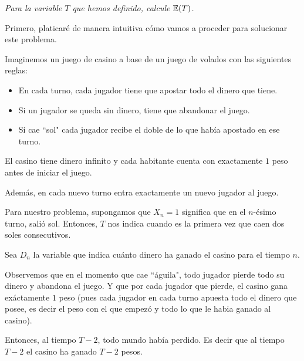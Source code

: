 \emph
{
	Para la variable $T$ que hemos definido, calcule $\mathbb{E}\! \left( T \right)$.
}\par\null

\afterstatement

	Primero, platicaré de manera intuitiva cómo vamos a proceder para solucionar este problema.\par\null

	Imaginemos un juego de casino a base de un juego de volados con las siguientes reglas:\par\null
    
	\begin{itemize}
			\item En cada turno, cada jugador tiene que apostar todo el dinero que tiene.
			\item Si un jugador se queda sin dinero, tiene que abandonar el juego.
			\item Si cae ``sol" cada jugador recibe el doble de lo que había apostado en ese turno.  
	\end{itemize}\par\null
   
	El casino tiene dinero infinito y cada habitante cuenta con exactamente $1$ peso antes de
	iniciar el juego.\par\null
   
	Además, en cada nuevo turno entra exactamente un nuevo jugador al juego.\par\null
   
	Para nuestro problema, supongamos que $X_n = 1$ significa que en el $n$-ésimo turno, salió sol.
	Entonces, $T$ nos indica cuando es la primera vez que caen dos soles consecutivos.\par\null
   
	Sea $D_n$ la variable que indica cuánto dinero ha ganado el casino para el tiempo $n$.\par\null
   
	Observemos que en el momento que cae ``águila", todo jugador pierde todo su dinero y abandona el juego.
	Y que por cada jugador que pierde, el casino gana exáctamente $1$ peso (pues cada jugador en cada
	turno apuesta todo el dinero que posee, es decir el peso con el que empezó y todo lo que le habia
	ganado al casino).\par\null
   
	Entonces, al tiempo $T-2$, todo mundo había perdido. Es decir que al tiempo $T-2$ el casino ha ganado
	$T-2$ pesos.\par\null
   
